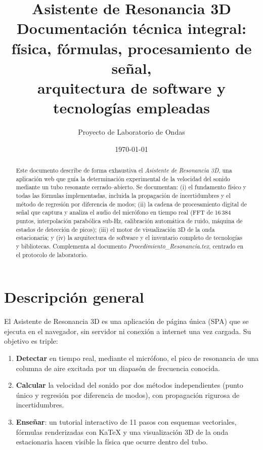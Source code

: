 \documentclass[11pt,a4paper]{article}
\title{\textbf{Asistente de Resonancia 3D}\\[2mm]
\large Documentación técnica integral: física, fórmulas, procesamiento de señal,\\
arquitectura de software y tecnologías empleadas}
\author{Proyecto de Laboratorio de Ondas}
\date{\today}
\begin{document}
\maketitle

\begin{abstract}
\noindent Este documento describe de forma exhaustiva el \emph{Asistente de Resonancia 3D},
una aplicación web que guía la determinación experimental de la velocidad del sonido mediante
un tubo resonante cerrado--abierto. Se documentan: (i) el fundamento físico y todas las
fórmulas implementadas, incluida la propagación de incertidumbres y el método de regresión
por diferencia de modos; (ii) la cadena de procesamiento digital de señal que captura y
analiza el audio del micrófono en tiempo real (FFT de 16\,384 puntos, interpolación
parabólica sub-Hz, calibración automática de ruido, máquina de estados de detección de
picos); (iii) el motor de visualización 3D de la onda estacionaria; y (iv) la arquitectura de
software y el inventario completo de tecnologías y bibliotecas. Complementa al documento
\emph{Procedimiento\_Resonancia.tex}, centrado en el protocolo de laboratorio.
\end{abstract}

\tableofcontents
\newpage

\section{Descripción general}

El Asistente de Resonancia 3D es una aplicación de página única (SPA) que se ejecuta en el
navegador, sin servidor ni conexión a internet una vez cargada. Su objetivo es triple:

\begin{enumerate}[nosep]
  \item \textbf{Detectar} en tiempo real, mediante el micrófono, el pico de resonancia de una
        columna de aire excitada por un diapasón de frecuencia conocida.
  \item \textbf{Calcular} la velocidad del sonido por dos métodos independientes (punto único
        y regresión por diferencia de modos), con propagación rigurosa de incertidumbres.
  \item \textbf{Enseñar}: un tutorial interactivo de 11 pasos con esquemas vectoriales,
        fórmulas renderizadas con KaTeX y una visualización 3D de la onda estacionaria
        hacen visible la física que ocurre dentro del tubo.
\end{enumerate}
\end{document}
